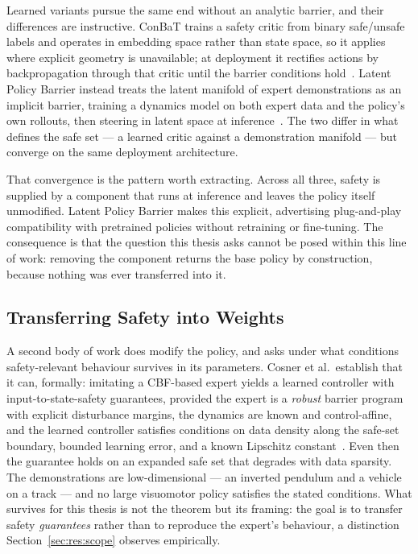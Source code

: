 \documentclass[a4paper,11pt]{report}
\begin{document}
Learned variants pursue the same end without an analytic barrier, and their differences are
instructive. ConBaT trains a safety critic from binary safe/unsafe labels and operates in embedding
space rather than state space, so it applies where explicit geometry is unavailable; at deployment
it rectifies actions by backpropagation through that critic until the barrier conditions
hold~\cite{meng2024conbat}. Latent Policy Barrier instead treats the latent manifold of expert
demonstrations as an implicit barrier, training a dynamics model on both expert data and the
policy's own rollouts, then steering in latent space at inference~\cite{sun2025lpb}. The two differ
in what defines the safe set --- a learned critic against a demonstration manifold --- but converge
on the same deployment architecture.

That convergence is the pattern worth extracting. Across all three, safety is supplied by a
component that runs at inference and leaves the policy itself unmodified. Latent Policy Barrier
makes this explicit, advertising plug-and-play compatibility with pretrained policies without
retraining or fine-tuning. The consequence is that the question this thesis asks cannot be posed
within this line of work: removing the component returns the base policy by construction, because
nothing was ever transferred into it.

\subsection{Transferring Safety into Weights}\label{sec:bg:transfer}

A second body of work does modify the policy, and asks under what conditions safety-relevant
behaviour survives in its parameters. Cosner et al.\ establish that it can, formally: imitating a
CBF-based expert yields a learned controller with input-to-state-safety guarantees, provided the
expert is a \emph{robust} barrier program with explicit disturbance margins, the dynamics are known
and control-affine, and the learned controller satisfies conditions on data density along the
safe-set boundary, bounded learning error, and a known Lipschitz constant~\cite{cosner2022il_cbf}.
Even then the guarantee holds on an expanded safe set that degrades with data sparsity. The
demonstrations are low-dimensional --- an inverted pendulum and a vehicle on a track --- and no
large visuomotor policy satisfies the stated conditions. What survives for this thesis is not the
theorem but its framing: the goal is to transfer safety \emph{guarantees} rather than to reproduce
the expert's behaviour, a distinction Section~\ref{sec:res:scope} observes empirically.
\end{document}
